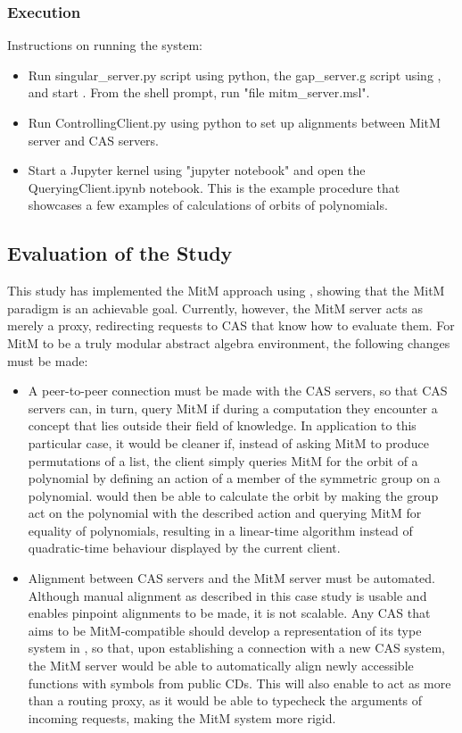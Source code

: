 \subsubsection{Execution}

Instructions on running the system:
\begin{itemize}
  \item Run singular\_server.py script using python, the gap\_server.g script
    using \GAP, and start \MMT. From the \MMT shell prompt, run 
    "file mitm\_server.msl".
  \item Run ControllingClient.py using python to set up alignments between
    MitM server and CAS servers.
  \item Start a Jupyter kernel using "jupyter notebook" and open the 
    QueryingClient.ipynb notebook. This is the example procedure that showcases
    a few examples of calculations of orbits of polynomials.
\end{itemize}

\subsection{Evaluation of the Study}

This study has implemented the MitM approach using \SCSCP, showing that the MitM 
paradigm is an achievable goal. Currently, however, the MitM server acts as 
merely a proxy, redirecting \SCSCP requests to CAS that know how to evaluate them.
For MitM to be a truly modular abstract algebra environment, the following
changes must be made:
\begin{itemize}
  \item A peer-to-peer connection must be made with the CAS servers, so that
    CAS servers can, in turn, query MitM if during a computation they encounter 
    a concept that lies outside their field of knowledge. In application to
    this particular case, it would be cleaner if, instead of asking MitM to 
    produce permutations of a list, the client simply queries MitM for the orbit 
    of a polynomial by defining an action of a member of the symmetric group on a 
    polynomial. \GAP would then be able to calculate the orbit by making the group 
    act on the polynomial with the described action and querying MitM for 
    equality of polynomials, resulting in a linear-time algorithm instead of
    quadratic-time behaviour displayed by the current client.
  \item Alignment between CAS servers and the MitM server must be automated.
    Although manual alignment as described in this case study is usable and
    enables pinpoint alignments to be made, it is not scalable. Any CAS that aims
    to be MitM-compatible should develop a representation of its type system
    in \MMT, so that, upon establishing a connection with a new CAS system, the 
    MitM server would be able to automatically align newly accessible functions 
    with symbols from public CDs. This will also enable \MMT to act as more than
    a routing proxy, as it would be able to typecheck the arguments of incoming
    requests, making the MitM system more rigid.
\end{itemize}

